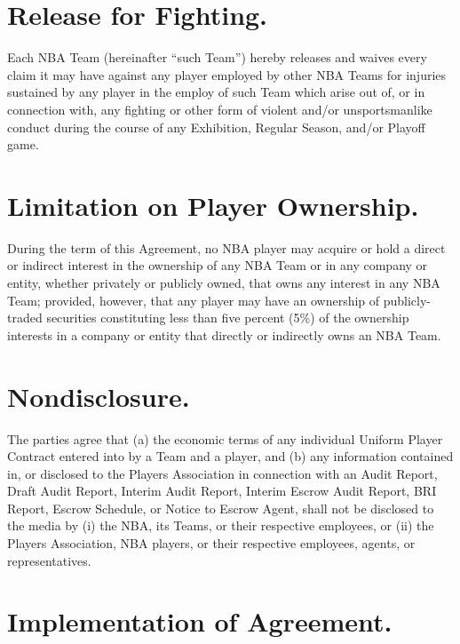 \documentclass[
]{book}
\begin{document}
\hypertarget{release-for-fighting.}{%
\section{Release for Fighting.}\label{release-for-fighting.}}

Each NBA Team (hereinafter ``such Team'') hereby releases and waives every claim it may have against any player employed by other NBA Teams for injuries sustained by any player in the employ of such Team which arise out of, or in connection with, any fighting or other form of violent and/or unsportsmanlike conduct during the course of any Exhibition, Regular Season, and/or Playoff game.

\hypertarget{limitation-on-player-ownership.}{%
\section{Limitation on Player Ownership.}\label{limitation-on-player-ownership.}}

During the term of this Agreement, no NBA player may acquire or hold a direct or indirect interest in the ownership of any NBA Team or in any company or entity, whether privately or publicly owned, that owns any interest in any NBA Team; provided, however, that any player may have an ownership of publicly-traded securities constituting less than five percent (5\%) of the ownership interests in a company or entity that directly or indirectly owns an NBA Team.

\hypertarget{nondisclosure.}{%
\section{Nondisclosure.}\label{nondisclosure.}}

The parties agree that (a) the economic terms of any individual Uniform Player Contract entered into by a Team and a player, and (b) any information contained in, or disclosed to the Players Association in connection with an Audit Report, Draft Audit Report, Interim Audit Report, Interim Escrow Audit Report, BRI Report, Escrow Schedule, or Notice to Escrow Agent, shall not be disclosed to the media by (i) the NBA, its Teams, or their respective employees, or (ii) the Players Association, NBA players, or their respective employees, agents, or representatives.

\hypertarget{implementation-of-agreement.}{%
\section{Implementation of Agreement.}\label{implementation-of-agreement.}}
\end{document}
